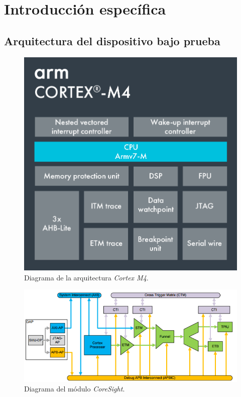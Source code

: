 \chapter{Introducción específica} %

\label{Chapter2}

\section{Arquitectura del dispositivo bajo prueba}
\label{sec:dut}

\begin{figure}[htbp]
	\centering
	\includegraphics[width=.8\textwidth]{./Figures/Cortex-M4.png}
    \caption{Diagrama de la arquitectura \emph{Cortex M4}\citep{WEBSITE:cortexm}.}
	\label{fig:cortexm}
\end{figure}

\begin{figure}[htbp]
	\centering
	\includegraphics[width=\textwidth]{./Figures/coresight.png}
    \caption{Diagrama del módulo \emph{CoreSight}\citep{WEBSITE:coresight}.}
	\label{fig:coresight}
\end{figure}

